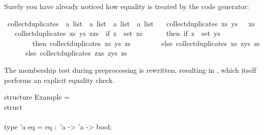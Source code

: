 \begin{isabellebody}
\begin{isamarkuptext}
\begin{itemize}
  \end{itemize}%
\end{isamarkuptext}%
\isamarkuptrue%
%
\isamarkuptrue%
%
\begin{isamarkuptext}%
Surely you have already noticed how equality is treated
  by the code generator:%
\end{isamarkuptext}%
\isamarkuptrue%
%
\isadelimquote
%
\endisadelimquote
%
\isatagquote
{}\isamarkupfalse%
\ collect{\isacharunderscore}duplicates\ {\isacharcolon}{\isacharcolon}\ {\isachardoublequoteopen}{\isacharprime}a\ list\ {\isasymRightarrow}\ {\isacharprime}a\ list\ {\isasymRightarrow}\ {\isacharprime}a\ list\ {\isasymRightarrow}\ {\isacharprime}a\ list{\isachardoublequoteclose}\ \isanewline
\ \ {\isachardoublequoteopen}collect{\isacharunderscore}duplicates\ xs\ ys\ {\isacharbrackleft}{\isacharbrackright}\ {\isacharequal}\ xs{\isachardoublequoteclose}\isanewline
\ \ {\isacharbar}\ {\isachardoublequoteopen}collect{\isacharunderscore}duplicates\ xs\ ys\ {\isacharparenleft}z{\isacharhash}zs{\isacharparenright}\ {\isacharequal}\ {\isacharparenleft}if\ z\ {\isasymin}\ set\ xs\isanewline
\ \ \ \ \ \ then\ if\ z\ {\isasymin}\ set\ ys\isanewline
\ \ \ \ \ \ \ \ then\ collect{\isacharunderscore}duplicates\ xs\ ys\ zs\isanewline
\ \ \ \ \ \ \ \ else\ collect{\isacharunderscore}duplicates\ xs\ {\isacharparenleft}z{\isacharhash}ys{\isacharparenright}\ zs\isanewline
\ \ \ \ \ \ else\ collect{\isacharunderscore}duplicates\ {\isacharparenleft}z{\isacharhash}xs{\isacharparenright}\ {\isacharparenleft}z{\isacharhash}ys{\isacharparenright}\ zs{\isacharparenright}{\isachardoublequoteclose}%
\endisatagquote
{\isafoldquote}%
%
\isadelimquote
%
\endisadelimquote
%
\begin{isamarkuptext}%
\noindent The membership test during preprocessing is rewritten,
  resulting in , which itself
  performs an explicit equality check.%
\end{isamarkuptext}%
\isamarkuptrue%
%
\isadelimquote
%
\endisadelimquote
%
\isatagquote
%
\begin{isamarkuptext}%
\isatypewriter%
\noindent%
\hspace*{0pt}structure Example = \\
\hspace*{0pt}struct\\
\hspace*{0pt}\\
\hspace*{0pt}type 'a eq = {}eq :~'a -> 'a -> bool{};\\

\end{isamarkuptext}
\end{isabellebody}

